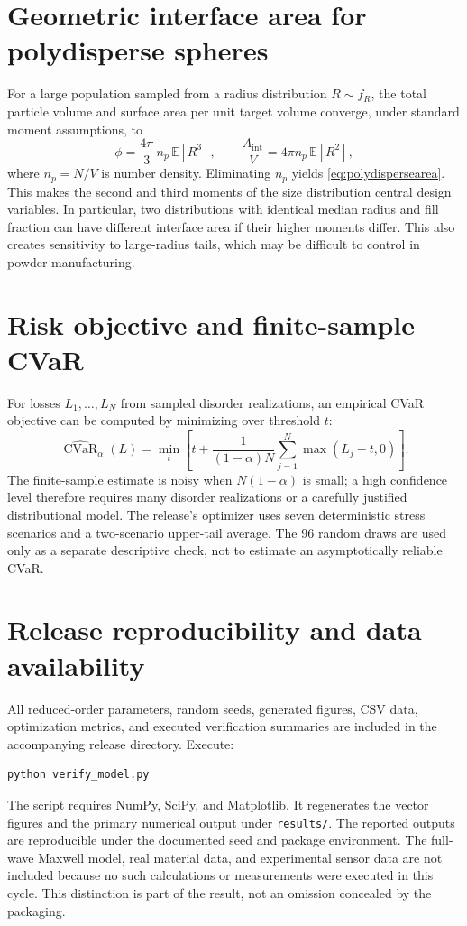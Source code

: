 \documentclass[10.5pt,a4paper]{article}
\newcommand{\CVaR}{\operatorname{CVaR}}
\begin{document}
\section{Geometric interface area for polydisperse spheres}
For a large population sampled from a radius distribution $R\sim f_R$, the total particle volume and surface area per unit target volume converge, under standard moment assumptions, to
\begin{equation}
\phi=\frac{4\pi}{3}\,n_p\,\mathbb E[R^3],\qquad
\frac{A_{\mathrm{int}}}{V}=4\pi n_p\,\mathbb E[R^2],
\end{equation}
where $n_p=N/V$ is number density. Eliminating $n_p$ yields \cref{eq:polydispersearea}. This makes the second and third moments of the size distribution central design variables. In particular, two distributions with identical median radius and fill fraction can have different interface area if their higher moments differ. This also creates sensitivity to large-radius tails, which may be difficult to control in powder manufacturing.

\section{Risk objective and finite-sample CVaR}
For losses $L_1,\ldots,L_N$ from sampled disorder realizations, an empirical CVaR objective can be computed by minimizing over threshold $t$:
\begin{equation}
\widehat{\CVaR}_\alpha(L)=\min_t\left[t+\frac{1}{(1-\alpha)N}\sum_{j=1}^{N}\max(L_j-t,0)\right].
\end{equation}
The finite-sample estimate is noisy when $N(1-\alpha)$ is small; a high confidence level therefore requires many disorder realizations or a carefully justified distributional model. The release's optimizer uses seven deterministic stress scenarios and a two-scenario upper-tail average. The 96 random draws are used only as a separate descriptive check, not to estimate an asymptotically reliable CVaR.

\section{Release reproducibility and data availability}
All reduced-order parameters, random seeds, generated figures, CSV data, optimization metrics, and executed verification summaries are included in the accompanying release directory. Execute:
\begin{verbatim}
python verify_model.py
\end{verbatim}
The script requires NumPy, SciPy, and Matplotlib. It regenerates the vector figures and the primary numerical output under \texttt{results/}. The reported outputs are reproducible under the documented seed and package environment. The full-wave Maxwell model, real material data, and experimental sensor data are not included because no such calculations or measurements were executed in this cycle. This distinction is part of the result, not an omission concealed by the packaging.

\printbibliography
\end{document}
